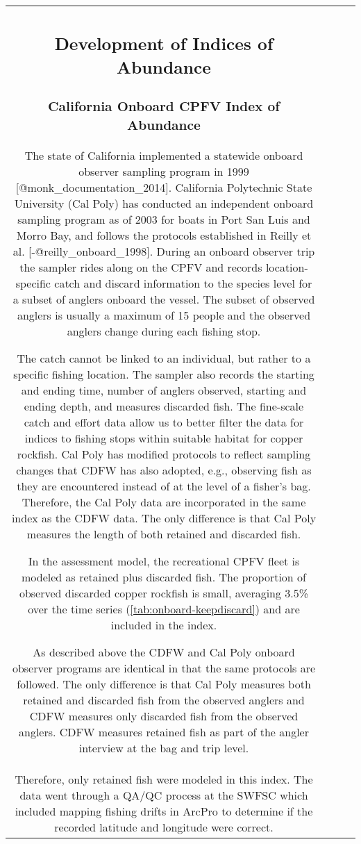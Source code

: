 \documentclass[11pt,
  letterpaper,
]{article}
\begin{document}
\begin{longtable}[t]{c>{\centering\arraybackslash}p{2cm}>{\centering\arraybackslash}p{2cm}>{\centering\arraybackslash}p{2cm}}
\pagebreak

\subsection{Development of Indices of Abundance}\label{development-of-indices-of-abundance}

\subsubsection{California Onboard CPFV Index of Abundance}\label{onboard-cpfv-index}

The state of California implemented a statewide onboard observer sampling program in 1999 {[}@monk\_documentation\_2014{]}. California Polytechnic State University (Cal Poly) has conducted an independent onboard sampling program as of 2003 for boats in Port San Luis and Morro Bay, and follows the protocols established in Reilly et al. {[}-@reilly\_onboard\_1998{]}. During an onboard observer trip the sampler rides along on the CPFV and records location-specific catch and discard information to the species level for a subset of anglers onboard the vessel. The subset of observed anglers is usually a maximum of 15 people and the observed anglers change during each fishing stop.

The catch cannot be linked to an individual, but rather to a specific fishing location. The sampler also records the starting and ending time, number of anglers observed, starting and ending depth, and measures discarded fish. The fine-scale catch and effort data allow us to better filter the data for indices to fishing stops within suitable habitat for copper rockfish. Cal Poly has modified protocols to reflect sampling changes that CDFW has also adopted, e.g., observing fish as they are encountered instead of at the level of a fisher's bag. Therefore, the Cal Poly data are incorporated in the same index as the CDFW data. The only difference is that Cal Poly measures the length of both retained and discarded fish.

In the assessment model, the recreational CPFV fleet is modeled as retained plus discarded fish. The proportion of observed discarded copper rockfish is small, averaging 3.5\% over the time series (\ref{tab:onboard-keepdiscard}) and are included in the index.

As described above the CDFW and Cal Poly onboard observer programs are identical in that the same protocols are followed. The only difference is that Cal Poly measures both retained and discarded fish from the observed anglers and CDFW measures only discarded fish from the observed anglers. CDFW measures retained fish as part of the angler interview at the bag and trip level.\\
Therefore, only retained fish were modeled in this index. The data went through a QA/QC process at the SWFSC which included mapping fishing drifts in ArcPro to determine if the recorded latitude and longitude were correct.


\end{longtable}
\end{document}
